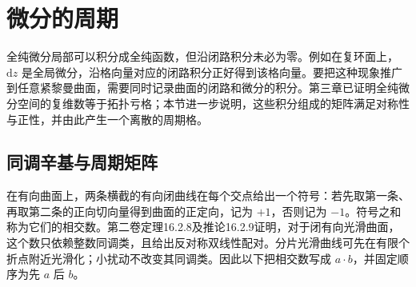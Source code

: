 
% 
% 

\section{微分的周期}
\label{g4:sec:0401}

全纯微分局部可以积分成全纯函数，但沿闭路积分未必为零。例如在复环面上，\(\mathrm{d}z\) 是全局微分，沿格向量对应的闭路积分正好得到该格向量。要把这种现象推广到任意紧黎曼曲面，需要同时记录曲面的闭路和微分的积分。第三章已证明全纯微分空间的复维数等于拓扑亏格；本节进一步说明，这些积分组成的矩阵满足对称性与正性，并由此产生一个离散的周期格。

\subsection{同调辛基与周期矩阵}
\label{g4:subsec:0401:01}

在有向曲面上，两条横截的有向闭曲线在每个交点给出一个符号：若先取第一条、再取第二条的正向切向量得到曲面的正定向，记为 \(+1\)，否则记为 \(-1\)。符号之和称为它们的相交数。第二卷定理16.2.8及推论16.2.9证明，对于闭有向光滑曲面，这个数只依赖整数同调类，且给出反对称双线性配对。分片光滑曲线可先在有限个折点附近光滑化；小扰动不改变其同调类。因此以下把相交数写成 \(a\cdot b\)，并固定顺序为先 \(a\) 后 \(b\)。

